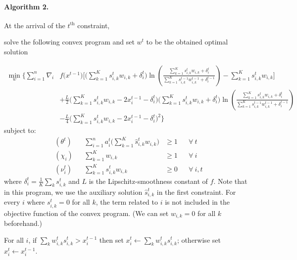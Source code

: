 \clearpage

\paragraph{Algorithm 2.} \label{algo-convex}

At the arrival of the $t^{\text{th}}$ constraint,
\begin{compactenum}
\item solve the following convex program and set $w^t$ to be the obtained optimal solution

\begin{align*}
\min_{w} \biggl\{\sum_{i=1}^{n}
\nabla_{i} & f\bigl(x^{t-1} \bigr) \biggl[  \biggl(\sum_{k=1}^{K} s_{i,k}^{t} w_{i,k}  + \delta_{i}^{t} \biggr)
\ln \left(\frac{ \sum_{k=1}^{K} s_{i,k}^{t} w_{i,k}  + \delta_{i}^{t} }{\sum_{k=1}^{K} s_{i,k}^{t-1} w_{i,k}^{t-1} + \delta_{i}^{t-1}}\right)
- \sum_{k=1}^{K}  s_{i,k}^{t} w_{i,k} \biggr] \\
%
&+ \frac{L}{2}\biggl( \sum_{k=1}^{K} s_{i,k}^{t} w_{i,k}  - 2x_{i}^{t-1} - \delta_{i}^{t} \biggr) \biggl(\sum_{k=1}^{K} s_{i,k}^{t} w_{i,k} + \delta_{i}^{t} \biggr)
\ln \left(\frac{ \sum_{k=1}^{K} s_{i,k}^{t} w_{i,k}  + \delta_{i}^{t} }{\sum_{k=1}^{K} s_{i,k}^{t-1} w_{i,k}^{t-1}  + \delta_{i}^{t-1}}\right) \\
%
&- \frac{L}{4} \biggl( \sum_{k=1}^{K} s_{i,k}^{t} w_{i,k}  - 2x_{i}^{t-1} - \delta_{i}^{t} \biggr)^{2}
\biggr\}
\end{align*}
%
\noindent subject to:
%
\begin{align*}
    (\theta^{t})  && \sum_{i=1}^{n} a_{i}^{t} \biggl( \sum_{k=1}^{K}  \hat{s}_{i,k}^{t} w_{i,k} \biggr) &\geq 1 && \forall\ t\\
    (\chi_{i}) && \sum_{k=1}^{K}  w_{i,k} &\geq 1 && \forall\ i\\
    (\nu_{i}^{t}) && \sum_{k=1}^{K} s_{i,k}^{t} w_{i,k} &\geq 0 && \forall\ i,t
\end{align*}
%
where $\delta_{i}^{t} = \frac{1}{K} \sum_{k} s_{i,k}^{t}$ and $L$ is the Lipschitz-smoothness constant of $f$.
Note that in this program, we use the auxiliary solution $\hat{s}_{i,k}^{t}$ in the first constraint. For every $i$ where $s_{i,k}^{t} = 0$ for all $k$, the term related to $i$ is not included in the objective function of the convex program.
(We can set $w_{i,k} = 0$ for all $k$ beforehand.)
%
\item For all $i$, if $\sum_{k} w_{i,k}^{t} s_{i,k}^{t} > x_{i}^{t-1}$ then set $x_{i}^{t} \gets \sum_{k} w_{i,k}^{t} s_{i,k}^{t}$;
otherwise set $x_{i}^{t} \gets x_{i}^{t-1}$.
\end{compactenum}

